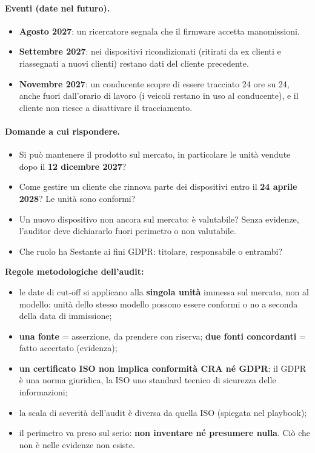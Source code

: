 \paragraph{Eventi (date nel futuro).}
\begin{itemize}
  \item \textbf{Agosto 2027}: un ricercatore segnala che il firmware accetta manomissioni.
  \item \textbf{Settembre 2027}: nei dispositivi ricondizionati (ritirati da ex clienti e riassegnati
    a nuovi clienti) restano dati del cliente precedente.
  \item \textbf{Novembre 2027}: un conducente scopre di essere tracciato 24 ore su 24, anche fuori
    dall'orario di lavoro (i veicoli restano in uso al conducente), e il cliente non riesce a
    disattivare il tracciamento.
\end{itemize}

\paragraph{Domande a cui rispondere.}
\begin{itemize}
  \item Si può mantenere il prodotto sul mercato, in particolare le unità vendute dopo il
    \textbf{12 dicembre 2027}?
  \item Come gestire un cliente che rinnova parte dei dispositivi entro il \textbf{24 aprile 2028}?
    Le unità sono conformi?
  \item Un nuovo dispositivo non ancora sul mercato: è valutabile? Senza evidenze, l'auditor deve
    dichiararlo fuori perimetro o non valutabile.
  \item Che ruolo ha Sestante ai fini GDPR: titolare, responsabile o entrambi?
\end{itemize}

\begin{esame}
\textbf{Regole metodologiche dell'audit:}
\begin{itemize}
  \item le date di cut-off si applicano alla \textbf{singola unità} immessa sul mercato, non al
    modello: unità dello stesso modello possono essere conformi o no a seconda della data di immissione;
  \item \textbf{una fonte} = asserzione, da prendere con riserva; \textbf{due fonti concordanti} =
    fatto accertato (evidenza);
  \item \textbf{un certificato ISO non implica conformità CRA né GDPR}: il GDPR è una norma giuridica,
    la ISO uno standard tecnico di sicurezza delle informazioni;
  \item la scala di severità dell'audit è diversa da quella ISO (spiegata nel playbook);
  \item il perimetro va preso sul serio: \textbf{non inventare né presumere nulla}. Ciò che non è
    nelle evidenze non esiste.
\end{itemize}
\end{esame}

